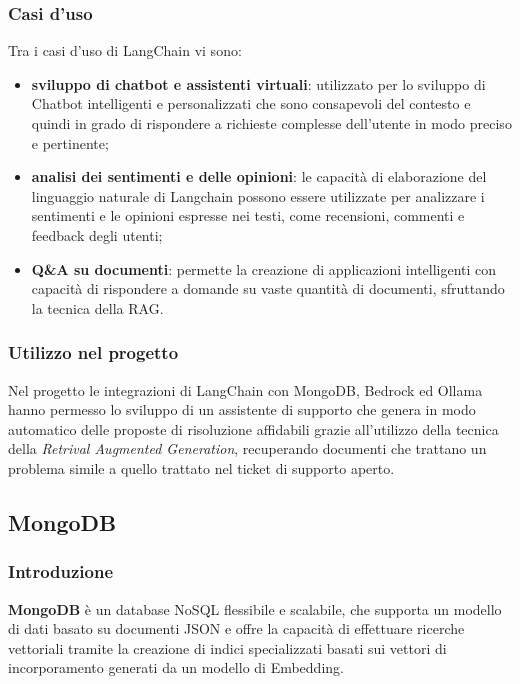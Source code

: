 \subsubsection{Casi d'uso}
 Tra i casi d’uso di LangChain vi sono:
 \begin{itemize}
    \item \textbf{sviluppo di chatbot e assistenti virtuali}: utilizzato per lo sviluppo di Chatbot intelligenti e personalizzati che sono consapevoli del contesto e quindi in grado di rispondere a richieste complesse dell’utente in modo preciso e pertinente;
    \item \textbf{analisi dei sentimenti e delle opinioni}: le capacità di elaborazione del linguaggio naturale di Langchain possono essere utilizzate per analizzare i sentimenti e le opinioni espresse nei testi, come recensioni, commenti e feedback degli utenti;
    \item \textbf{Q\&A su documenti}: permette la creazione di applicazioni intelligenti con capacità di rispondere a domande su vaste quantità di documenti, sfruttando la tecnica della RAG.
\end{itemize} 

\subsubsection{Utilizzo nel progetto}
 Nel progetto le integrazioni di LangChain con MongoDB, Bedrock ed Ollama hanno permesso lo sviluppo di un assistente di supporto che genera in modo automatico delle proposte di risoluzione affidabili grazie all’utilizzo della tecnica della \textit{Retrival Augmented Generation}, recuperando documenti che trattano un problema simile a quello trattato nel ticket di supporto aperto.


\subsection{MongoDB}

\subsubsection{Introduzione}
\textbf{MongoDB} è un database NoSQL flessibile e scalabile, che supporta un modello di dati basato su documenti JSON e offre la capacità di effettuare ricerche vettoriali tramite la creazione di indici specializzati basati sui vettori di incorporamento generati da un modello di Embedding.\\

